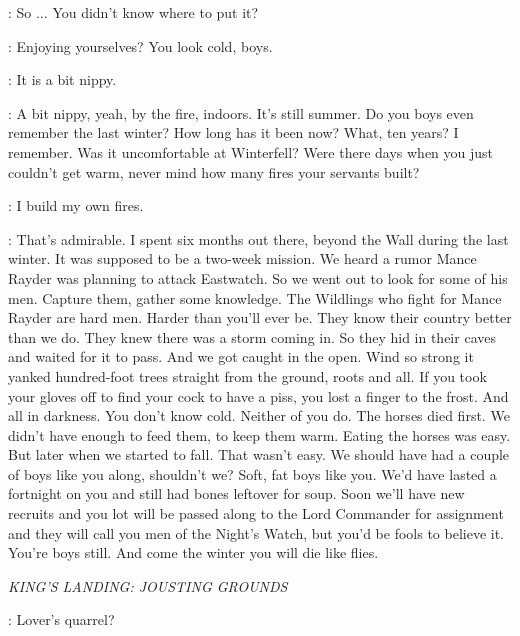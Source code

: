 \SAM: So $\ldots$ You didn't know where to put it? 


\ALLISER: Enjoying yourselves? You look cold, boys. 

\SAM: It is a bit nippy. 

\ALLISER: A bit nippy, yeah, by the fire, indoors. It's still summer. Do you boys even remember the last winter? How long has it been now? What, ten years? I remember. Was it uncomfortable at Winterfell? Were there days when you just couldn't get warm, never mind how many fires your servants built? 

\JON: I build my own fires. 

\ALLISER: That's admirable. I spent six months out there, beyond the Wall during the last winter. It was supposed to be a two-week mission. We heard a rumor Mance Rayder was planning to attack Eastwatch. So we went out to look for some of his men. Capture them, gather some knowledge. The Wildlings who fight for Mance Rayder are hard men. Harder than you'll ever be. They know their country better than we do. They knew there was a storm coming in. So they hid in their caves and waited for it to pass. And we got caught in the open. Wind so strong it yanked hundred-foot trees straight from the ground, roots and all. If you took your gloves off to find your cock to have a piss, you lost a finger to the frost. And all in darkness. You don't know cold. Neither of you do. The horses died first. We didn't have enough to feed them, to keep them warm. Eating the horses was easy. But later when we started to fall. That wasn't easy. We should have had a couple of boys like you along, shouldn't we? Soft, fat boys like you. We'd have lasted a fortnight on you and still had bones leftover for soup. Soon we'll have new recruits and you lot will be passed along to the Lord Commander for assignment and they will call you men of the Night's Watch, but you'd be fools to believe it. You're boys still. And come the winter you will die like flies. 


\scene

\textit{KING'S LANDING: JOUSTING GROUNDS}


\LITTLEFINGER: Lover's quarrel? 

